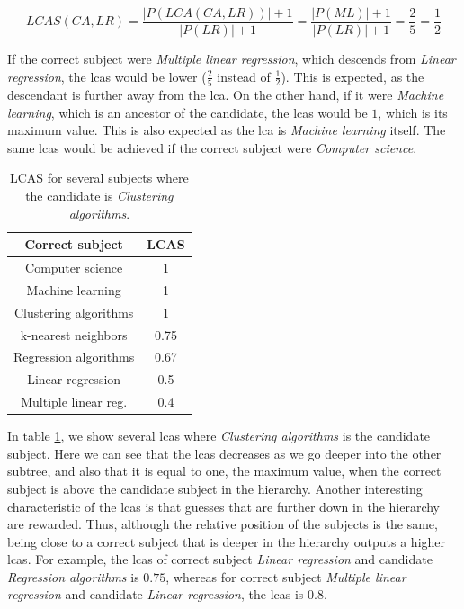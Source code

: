 $$ LCAS(CA, LR) = \frac{|P(LCA(CA, LR))|+1}{|P(LR)|+1} = \frac{|P(ML)|+1}{|P(LR)|+1} = \frac{2}{5} = \frac{1}{2} $$

If the correct subject were \textit{Multiple linear regression}, which descends from \textit{Linear regression}, the \acrshort{lcas} would be lower ($\frac{2}{5}$ instead of $\frac{1}{2}$). This is expected, as the descendant is further away from the \acrshort{lca}. On the other hand, if it were \textit{Machine learning}, which is an ancestor of the candidate, the \acrshort{lcas} would be $1$, which is its maximum value. This is also expected as the \acrshort{lca} is \textit{Machine learning} itself. The same \acrshort{lcas} would be achieved if the correct subject were \textit{Computer science}.

\begin{table}[]
    \centering
    \begin{tabular}{|c|c|}
        \hline
        \textbf{Correct subject} & \textbf{LCAS} \\ \hline\hline
        Computer science & 1 \\ \hline
        Machine learning & 1 \\ \hline
        Clustering algorithms & 1 \\ \hline
        k-nearest neighbors & 0.75 \\ \hline
        Regression algorithms & 0.67 \\ \hline
        Linear regression & 0.5 \\ \hline
        Multiple linear reg. & 0.4 \\ \hline
    \end{tabular}
    \caption{LCAS for several subjects where the candidate is \textit{Clustering algorithms}.}
    \label{tab:lcas_example}
\end{table}

In table \ref{tab:lcas_example}, we show several \acrshort{lcas} where \textit{Clustering algorithms} is the candidate subject. Here we can see that the \acrshort{lcas} decreases as we go deeper into the other subtree, and also that it is equal to one, the maximum value, when the correct subject is above the candidate subject in the hierarchy. Another interesting characteristic of the \acrshort{lcas} is that guesses that are further down in the hierarchy are rewarded. Thus, although the relative position of the subjects is the same, being close to a correct subject that is deeper in the hierarchy outputs a higher \acrshort{lcas}. For example, the \acrshort{lcas} of correct subject \textit{Linear regression} and candidate \textit{Regression algorithms} is $0.75$, whereas for correct subject \textit{Multiple linear regression} and candidate \textit{Linear regression}, the \acrshort{lcas} is $0.8$.
